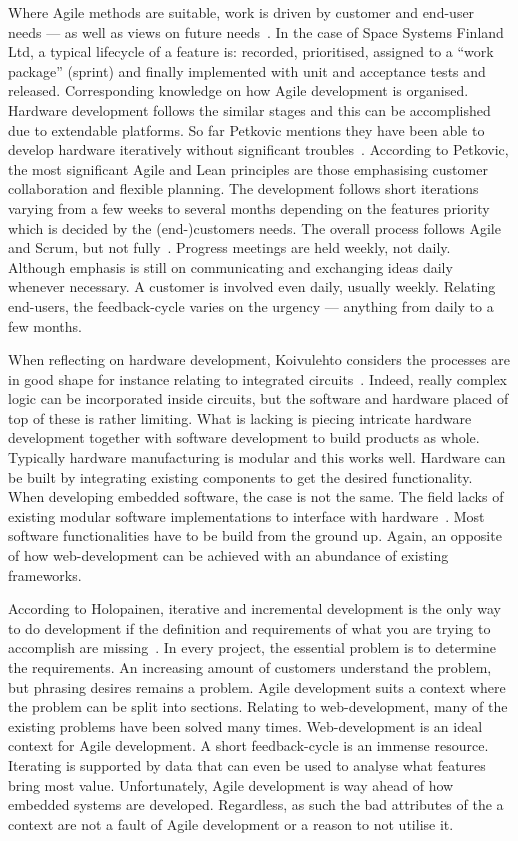 \documentclass[english]{tktltiki2}
\begin{document}
Where Agile methods are suitable, work is driven by customer and end-user needs — as well as views on future needs~\cite{Pet15}. In the case of Space Systems Finland Ltd, a typical lifecycle of a feature is: recorded, prioritised, assigned to a “work package” (sprint) and finally implemented with unit and acceptance tests and released. Corresponding knowledge on how Agile development is organised. Hardware development follows the similar stages and this can be accomplished due to extendable platforms. So far Petkovic mentions they have been able to develop hardware iteratively without significant troubles~\cite{Pet15}. According to Petkovic, the most significant Agile and Lean principles are those emphasising customer collaboration and flexible planning. The development follows short iterations varying from a few weeks to several months depending on the features priority which is decided by the (end-)customers needs. The overall process follows Agile and Scrum, but not fully~\cite{Pet15}. Progress meetings are held weekly, not daily. Although emphasis is still on communicating and exchanging ideas daily whenever necessary. A customer is involved even daily, usually weekly. Relating end-users, the feedback-cycle varies on the urgency — anything from daily to a few months.

When reflecting on hardware development, Koivulehto considers the processes are in good shape for instance relating to integrated circuits~\cite{Hol15a}. Indeed, really complex logic can be incorporated inside circuits, but the software and hardware placed of top of these is rather limiting. What is lacking is piecing intricate hardware development together with software development to build products as whole. Typically hardware manufacturing is modular and this works well. Hardware can be built by integrating existing components to get the desired functionality. When developing embedded software, the case is not the same. The field lacks of existing modular software implementations to interface with hardware~\cite{Hol15a}. Most software functionalities have to be build from the ground up. Again, an opposite of how web-development can be achieved with an abundance of existing frameworks.

According to Holopainen, iterative and incremental development is the only way to do development if the definition and requirements of what you are trying to accomplish are missing~\cite{Hol15a}. In every project, the essential problem is to determine the requirements. An increasing amount of customers understand the problem, but phrasing desires remains a problem. Agile development suits a context where the problem can be split into sections. Relating to web-development, many of the existing problems have been solved many times. Web-development is an ideal context for Agile development. A short feedback-cycle is an immense resource. Iterating is supported by data that can even be used to analyse what features bring most value. Unfortunately, Agile development is way ahead of how embedded systems are developed. Regardless, as such the bad attributes of the a context are not a fault of Agile development or a reason to not utilise it.
\end{document}
